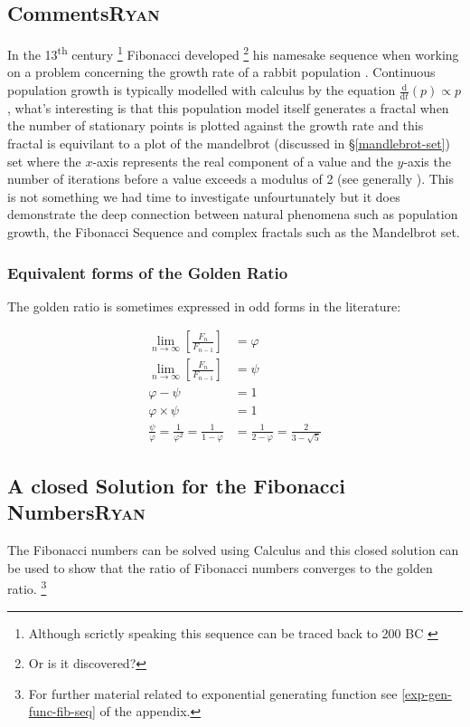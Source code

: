 \documentclass[a4paper,11pt,twoside]{article}
\begin{document}
\subsection{Comments\hfill{}\textsc{Ryan}}
\label{comment}
In the 13\textsuperscript{th} century \footnote{Although scrictly speaking this sequence can be traced back to 200 BC \cite{prasadHowFibonacciNumber2018,brownHistoryApplicationsFibonacci2019}} Fibonacci developed \footnote{Or is it discovered?}  his namesake sequence when working on a problem concerning the growth rate
of a rabbit population \cite{ronknottFibonacciNumbersGolden2016}.
Continuous population growth is typically modelled with calculus by the equation \(\frac{\mathrm{d} }{\mathrm{d} t}\left( p \right)
\propto p\) \cite[\S 11.1]{giordanoFirstCourseMathematical2014}, what's interesting is that this population model itself
generates a fractal when the number of stationary points is plotted against the
growth rate \cite[Ch. 3]{briggsTurbulentMirrorIllustrated1989}
and this fractal is equivilant to a plot of the mandelbrot (discussed in \S \ref{mandlebrot-set}) set where the \(x\)-axis represents the real component of a value and the \(y\)-axis the number of iterations before a value exceeds a modulus of 2 (see generally \cite{mullerThisEquationWill2020}). This is not
something we had time to investigate unfourtunately but it does demonstrate the deep connection between natural phenomena such as population growth, the Fibonacci Sequence and complex fractals such as the Mandelbrot set.
\subsubsection{Equivalent forms of the Golden Ratio}
\label{sec:org4add0b5}
The golden ratio is sometimes expressed in odd forms in the literature:


$$\begin{aligned}
\lim_{n     \rightarrow \infty }\left[ \frac{F_n}{F_{n- 1} }  \right] &= \varphi \\
\lim_{n     \rightarrow \infty }\left[ \frac{F_n}{F_{n- 1} }  \right] &= \psi \\
\varphi - \psi &=  1 \\
\varphi \times  \psi  &= 1 \\
\frac{\psi}{\varphi}  = \frac{1}{\varphi^2} = \frac{1}{1-\varphi} &= \frac{1}{2-\varphi} = \frac{2}{3 - \sqrt{5}  }
\end{aligned}$$
\subsection{A closed Solution for the Fibonacci Numbers\hfill{}\textsc{Ryan}}
\label{solving-the-sequence}
The Fibonacci numbers can be solved  using Calculus and this closed solution can be used to show that the ratio of Fibonacci numbers converges to the golden ratio. \footnote{For further material related to exponential generating function see \ref{exp-gen-func-fib-seq} of the appendix.}
\end{document}
